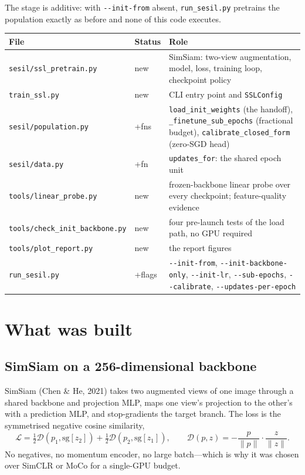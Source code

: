 \documentclass[11pt,a4paper]{article}
\newcommand{\code}[1]{\texttt{\small #1}}
\newcommand{\file}[1]{\texttt{\small #1}}
\begin{document}
The stage is additive: with \code{-{}-init-from} absent, \code{run\_sesil.py}
pretrains the population exactly as before and none of this code executes.

\begin{longtable}{@{}llp{7.4cm}@{}}
\toprule
\textbf{File} & \textbf{Status} & \textbf{Role} \\
\midrule
\endhead
\file{sesil/ssl\_pretrain.py} & new & SimSiam: two-view augmentation, model,
loss, training loop, checkpoint policy \\
\file{train\_ssl.py} & new & CLI entry point and \code{SSLConfig} \\
\file{sesil/population.py} & +fns & \code{load\_init\_weights} (the handoff),
\code{\_finetune\_sub\_epochs} (fractional budget),
\code{calibrate\_closed\_form} (zero-SGD head) \\
\file{sesil/data.py} & +fn & \code{updates\_for}: the shared epoch unit \\
\file{tools/linear\_probe.py} & new & frozen-backbone linear probe over every
checkpoint; feature-quality evidence \\
\file{tools/check\_init\_backbone.py} & new & four pre-launch tests of the load
path, no GPU required \\
\file{tools/plot\_report.py} & new & the report figures \\
\file{run\_sesil.py} & +flags & \code{-{}-init-from},
\code{-{}-init-backbone-only}, \code{-{}-init-lr}, \code{-{}-sub-epochs},
\code{-{}-calibrate}, \code{-{}-updates-per-epoch} \\
\bottomrule
\end{longtable}

\section{What was built}

\subsection{SimSiam on a 256-dimensional backbone}

SimSiam (Chen \& He, 2021) takes two augmented views of one image through a
shared backbone and projection MLP, maps one view's projection to the other's
with a prediction MLP, and stop-gradients the target branch. The loss is the
symmetrised negative cosine similarity,
\begin{equation}
\mathcal{L} = \tfrac12 \mathcal{D}(p_1, \mathrm{sg}[z_2])
            + \tfrac12 \mathcal{D}(p_2, \mathrm{sg}[z_1]),
\qquad
\mathcal{D}(p,z) = -\frac{p}{\lVert p\rVert}\cdot\frac{z}{\lVert z\rVert}.
\end{equation}
No negatives, no momentum encoder, no large batch---which is why it was chosen
over SimCLR or MoCo for a single-GPU budget.
\end{document}
